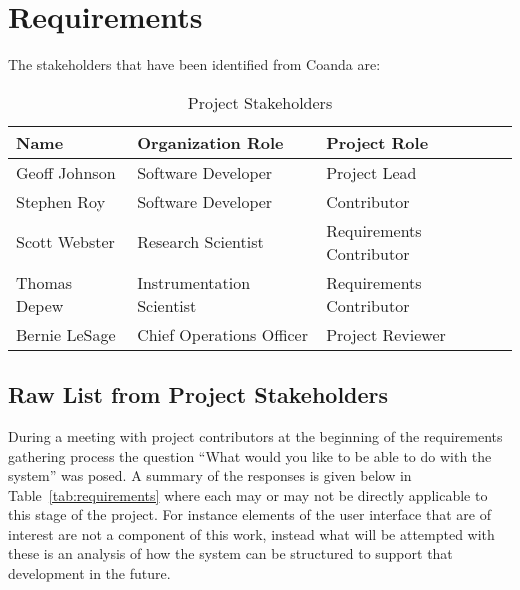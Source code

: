 \section{Requirements}\label{sec:req}

  The stakeholders that have been identified from Coanda are:

  \begin{table}[H]
    \centering
    \begin{tabular}{l p{6cm} p{6cm}}
      \toprule
      Name & Organization Role & Project Role \\ [0.5ex]
      \midrule
      Geoff Johnson & Software Developer        & Project Lead \\
      Stephen Roy   & Software Developer        & Contributor \\
      Scott Webster & Research Scientist        & Requirements Contributor \\
      Thomas Depew  & Instrumentation Scientist & Requirements Contributor \\
      Bernie LeSage & Chief Operations Officer  & Project Reviewer \\
      \bottomrule
    \end{tabular}
    \caption{Project Stakeholders}\label{tab:stakeholders}
  \end{table}

  \subsection{Raw List from Project Stakeholders}\label{sec:req-sh}

    During a meeting with project contributors at the beginning of the
    requirements gathering process the question ``What would you like to be
    able to do with the system'' was posed. A summary of the responses is
    given below in Table~\ref{tab:requirements} where each may or may not
    be directly applicable to this stage of the project. For instance elements
    of the user interface that are of interest are not a component of this
    work, instead what will be attempted with these is an analysis of how the
    system can be structured to support that development in the future.

